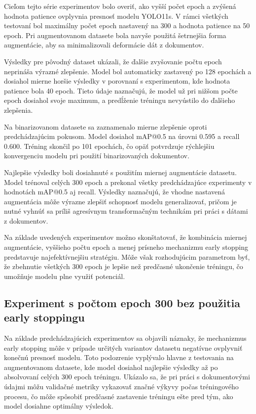                 Cieľom tejto série experimentov bolo overiť, ako vyšší počet epoch a zvýšená hodnota patience ovplyvnia presnosť modelu YOLO11s. V rámci všetkých testovaní bol maximálny počet epoch nastavený na 300 a hodnota patience na 50 epoch. Pri augmentovanom datasete bola navyše použitá šetrnejšia forma augmentácie, aby sa minimalizovali deformácie dát z dokumentov.

                Výsledky pre pôvodný dataset ukázali, že ďalšie zvyšovanie počtu epoch neprináša výrazné zlepšenie. Model bol automaticky zastavený po 128 epochách a dosiahol mierne horšie výsledky v porovnaní s experimentom, kde hodnota patience bola 40 epoch. Tieto údaje naznačujú, že model už pri nižšom počte epoch dosiahol svoje maximum, a predĺženie tréningu nevyústilo do ďalšieho zlepšenia.

                Na binarizovanom datasete sa zaznamenalo mierne zlepšenie oproti predchádzajúcim pokusom. Model dosiahol mAP@0.5 na úrovni 0.595 a recall 0.600. Tréning skončil po 101 epochách, čo opäť potvrdzuje rýchlejšiu konvergenciu modelu pri použití binarizovaných dokumentov.

                Najlepšie výsledky boli dosiahnuté s použitím miernej augmentácie datasetu. Model trénoval celých 300 epoch a prekonal všetky predchádzajúce experimenty v hodnotách mAP@0.5 aj recall. Výsledky naznačujú, že vhodne nastavená augmentácia môže výrazne zlepšiť schopnosť modelu generalizovať, pričom je nutné vyhnúť sa príliš agresívnym transformačným technikám pri práci s dátami z dokumentov.

                Na základe uvedených experimentov možno skonštatovať, že kombinácia miernej augmentácie, vyššieho počtu epoch a menej prísneho mechanizmu early stopping predstavuje najefektívnejšiu stratégiu. Môže však rozhodujúcim parametrom byť, že zbehnutie všetkých 300 epoch je lepšie než predčasné ukončenie tréningu, čo umožňuje modelu plne využiť potenciál. 

            \subsection{Experiment s počtom epoch 300 bez použitia early stoppingu}

            Na základe predchádzajúcich experimentov sa objavili náznaky, že mechanizmus early stopping môže v prípade určitých variantov datasetu negatívne ovplyvniť konečnú presnosť modelu. Toto podozrenie vyplývalo hlavne z testovania na augmentovanom datasete, kde model dosiahol najlepšie výsledky až po absolvovaní celých 300 epoch tréningu. Ukázalo sa, že pri práci s dokumentovými údajmi môžu validačné metriky vykazovať značné výkyvy počas tréningového procesu, čo môže spôsobiť predčasné zastavenie tréningu ešte pred tým, ako model dosiahne optimálny výsledok.

